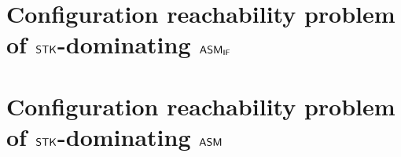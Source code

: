 \section{Configuration reachability problem of $\mathsf{STK}$-dominating $\textsf{ASM}_\textsf{IF}$}\label{sec:reach-ifamass}



\section{Configuration reachability problem of $\mathsf{STK}$-dominating $\textsf{ASM}$}\label{sec:reach-amass}
